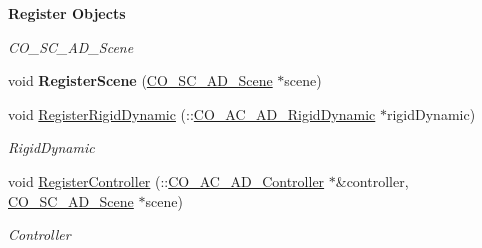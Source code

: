 \begin{Indent}{\bf Register Objects}\par
{\em \label{_amgrp6a304d42496b952c380b92415f075c10}
 CO\_\-SC\_\-AD\_\-Scene }\begin{DoxyCompactItemize}
\item 
\hypertarget{classContent_1_1Physics_1_1PhysX_1_1Physics_aa78fa950075406f99d68fca7a1ee9418}{
void {\bfseries RegisterScene} (\hyperlink{classContent_1_1CO__SC__AD__Scene}{CO\_\-SC\_\-AD\_\-Scene} $\ast$scene)}
\label{classContent_1_1Physics_1_1PhysX_1_1Physics_aa78fa950075406f99d68fca7a1ee9418}

\item 
\hypertarget{classContent_1_1Physics_1_1PhysX_1_1Physics_a623b34295e885992ac9857ea194315ac}{
void \hyperlink{classContent_1_1Physics_1_1PhysX_1_1Physics_a623b34295e885992ac9857ea194315ac}{RegisterRigidDynamic} (::\hyperlink{classContent_1_1Actor_1_1Admin_1_1RigidDynamic}{CO\_\-AC\_\-AD\_\-RigidDynamic} $\ast$rigidDynamic)}
\label{classContent_1_1Physics_1_1PhysX_1_1Physics_a623b34295e885992ac9857ea194315ac}

\begin{DoxyCompactList}\small\item\em RigidDynamic \item\end{DoxyCompactList}\item 
\hypertarget{classContent_1_1Physics_1_1PhysX_1_1Physics_a1cec453a952f39bf5378077976b5b7ec}{
void \hyperlink{classContent_1_1Physics_1_1PhysX_1_1Physics_a1cec453a952f39bf5378077976b5b7ec}{RegisterController} (::\hyperlink{classContent_1_1Actor_1_1Admin_1_1Controller}{CO\_\-AC\_\-AD\_\-Controller} $\ast$\&controller, \hyperlink{classContent_1_1CO__SC__AD__Scene}{CO\_\-SC\_\-AD\_\-Scene} $\ast$scene)}
\label{classContent_1_1Physics_1_1PhysX_1_1Physics_a1cec453a952f39bf5378077976b5b7ec}

\begin{DoxyCompactList}\small\item\em Controller \item\end{DoxyCompactList}\end{DoxyCompactItemize}
\end{Indent}
